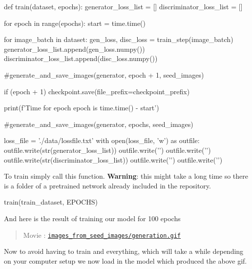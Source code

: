 \documentclass[%
oneside,                 %
final,                   %
10pt]{article}
\newenvironment{doconce:movie}{}{}
\newcounter{doconce:movie:counter}
\begin{document}
\bpycod
def train(dataset, epochs):
    generator_loss_list = []
    discriminator_loss_list = []

    for epoch in range(epochs):
        start = time.time()

        for image_batch in dataset:
            gen_loss, disc_loss = train_step(image_batch)
            generator_loss_list.append(gen_loss.numpy())
            discriminator_loss_list.append(disc_loss.numpy())

        #generate_and_save_images(generator, epoch + 1, seed_images)

        if (epoch + 1) %
            checkpoint.save(file_prefix=checkpoint_prefix)

        print(f'Time for epoch {epoch} is {time.time() - start}')

    #generate_and_save_images(generator, epochs, seed_images)

    loss_file = './data/lossfile.txt'
    with open(loss_file, 'w') as outfile:
        outfile.write(str(generator_loss_list))
        outfile.write('\n')
        outfile.write('\n')
        outfile.write(str(discriminator_loss_list))
        outfile.write('\n')
        outfile.write('\n')

\epycod


To train simply call this function. \textbf{Warning}: this might take a long time so
there is a folder of a pretrained network already included in the repository.



\bpycod
train(train_dataset, EPOCHS)

\epycod


And here is the result of training our model for 100 epochs


\begin{doconce:movie}
\begin{quote}
Movie :  \href{run:images_from_seed_images/generation.gif}{\nolinkurl{images_from_seed_images/generation.gif}}
\end{quote}
\end{doconce:movie}


Now to avoid having to train and everything, which will take a while depending
on your computer setup we now load in the model which produced the above gif.
\end{document}
